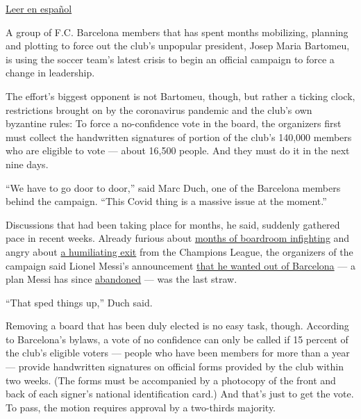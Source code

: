 \href{https://www.nytimes3xbfgragh.onion/es/2020/09/10/espanol/deportes/barcelona-bartomeu.html}{Leer
en español}

A group of F.C. Barcelona members that has spent months mobilizing,
planning and plotting to force out the club's unpopular president, Josep
Maria Bartomeu, is using the soccer team's latest crisis to begin an
official campaign to force a change in leadership.

The effort's biggest opponent is not Bartomeu, though, but rather a
ticking clock, restrictions brought on by the coronavirus pandemic and
the club's own byzantine rules: To force a no-confidence vote in the
board, the organizers first must collect the handwritten signatures of
portion of the club's 140,000 members who are eligible to vote --- about
16,500 people. And they must do it in the next nine days.

``We have to go door to door,'' said Marc Duch, one of the Barcelona
members behind the campaign. ``This Covid thing is a massive issue at
the moment.''

Discussions that had been taking place for months, he said, suddenly
gathered pace in recent weeks. Already furious about
\href{https://www.nytimes3xbfgragh.onion/2020/04/16/sports/fc-barcelona-boardroom.html}{months
of boardroom infighting} and angry about
\href{https://www.nytimes3xbfgragh.onion/2020/08/14/sports/soccer/bayern-barcelona-8-2-champions-league.html?action=click\&module=RelatedLinks\&pgtype=Article}{a
humiliating exit} from the Champions League, the organizers of the
campaign said Lionel Messi's announcement
\href{https://www.nytimes3xbfgragh.onion/2020/08/25/sports/soccer/lionel-messi-barcelona.html}{that
he wanted out of Barcelona} --- a plan Messi has since
\href{https://www.nytimes3xbfgragh.onion/2020/09/04/sports/soccer/lionel-messi-barcelona.html}{abandoned}
--- was the last straw.

``That sped things up,'' Duch said.

Removing a board that has been duly elected is no easy task, though.
According to Barcelona's bylaws, a vote of no confidence can only be
called if 15 percent of the club's eligible voters --- people who have
been members for more than a year --- provide handwritten signatures on
official forms provided by the club within two weeks. (The forms must be
accompanied by a photocopy of the front and back of each signer's
national identification card.) And that's just to get the vote. To pass,
the motion requires approval by a two-thirds majority.

